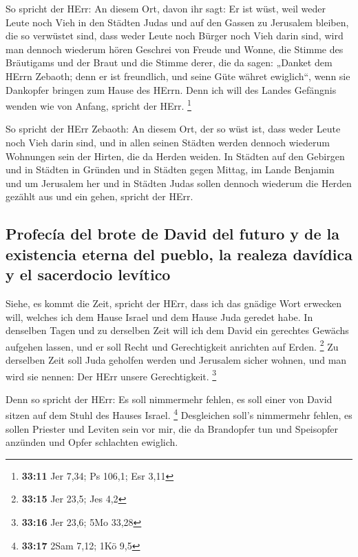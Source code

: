  So spricht der HErr: An diesem Ort, davon ihr sagt: Er
ist wüst, weil weder Leute noch Vieh in den Städten Judas und auf den
Gassen zu Jerusalem bleiben, die so verwüstet sind, dass weder Leute
noch Bürger noch Vieh darin sind,  wird man dennoch
wiederum hören Geschrei von Freude und Wonne, die Stimme des Bräutigams
und der Braut und die Stimme derer, die da sagen: „Danket dem HErrn
Zebaoth; denn er ist freundlich, und seine Güte währet ewiglich``, wenn
sie Dankopfer bringen zum Hause des HErrn. Denn ich will des Landes
Gefängnis wenden wie von Anfang, spricht der HErr. \footnote{\textbf{33:11}
  Jer 7,34; Ps 106,1; Esr 3,11}

 So spricht der HErr Zebaoth: An diesem Ort, der so wüst
ist, dass weder Leute noch Vieh darin sind, und in allen seinen Städten
werden dennoch wiederum Wohnungen sein der Hirten, die da Herden weiden.
 In Städten auf den Gebirgen und in Städten in Gründen
und in Städten gegen Mittag, im Lande Benjamin und um Jerusalem her und
in Städten Judas sollen dennoch wiederum die Herden gezählt aus und ein
gehen, spricht der HErr.

\hypertarget{profecuxeda-del-brote-de-david-del-futuro-y-de-la-existencia-eterna-del-pueblo-la-realeza-davuxeddica-y-el-sacerdocio-levuxedtico}{%
\subsection{Profecía del brote de David del futuro y de la existencia
eterna del pueblo, la realeza davídica y el sacerdocio
levítico}\label{profecuxeda-del-brote-de-david-del-futuro-y-de-la-existencia-eterna-del-pueblo-la-realeza-davuxeddica-y-el-sacerdocio-levuxedtico}}

 Siehe, es kommt die Zeit, spricht der HErr, dass ich das
gnädige Wort erwecken will, welches ich dem Hause Israel und dem Hause
Juda geredet habe.  In denselben Tagen und zu derselben
Zeit will ich dem David ein gerechtes Gewächs aufgehen lassen, und er
soll Recht und Gerechtigkeit anrichten auf Erden. \footnote{\textbf{33:15}
  Jer 23,5; Jes 4,2}  Zu derselben Zeit soll Juda
geholfen werden und Jerusalem sicher wohnen, und man wird sie nennen:
Der HErr unsere Gerechtigkeit. \footnote{\textbf{33:16} Jer 23,6; 5Mo
  33,28}

 Denn so spricht der HErr: Es soll nimmermehr fehlen, es
soll einer von David sitzen auf dem Stuhl des Hauses Israel. \footnote{\textbf{33:17}
  2Sam 7,12; 1Kö 9,5}  Desgleichen soll's nimmermehr
fehlen, es sollen Priester und Leviten sein vor mir, die da Brandopfer
tun und Speisopfer anzünden und Opfer schlachten ewiglich.


